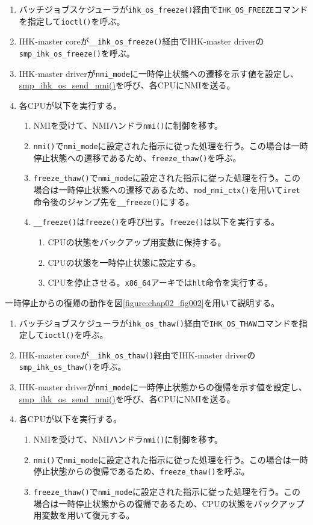 \documentclass[twoside,11pt,fleqn]{book}
\newcommand\textttw[1]{\mathchardef\UrlBreakPenalty=100\mathchardef\UrlBigBreakPenalty=100\url{#1}}
\begin{document}
\begin{enumerate}
\item バッチジョブスケジューラが\texttt{ihk\_os\_freeze()}経由で\texttt{IHK\_OS\_FREEZE}コマンドを指定して\texttt{ioctl()}を呼ぶ。
\item IHK-master coreが\texttt{\_\_ihk\_os\_freeze()}経由でIHK-master driverの\texttt{smp\_ihk\_os\_freeze()}を呼ぶ。
\item IHK-master driverが\texttt{nmi\_mode}に一時停止状態への遷移を示す値を設定し、\textttw{smp\_ihk\_os\_send\_nmi()}を呼び、各CPUにNMIを送る。
\item 各CPUが以下を実行する。
\begin{enumerate}
\item NMIを受けて、NMIハンドラ\texttt{nmi()}に制御を移す。
\item \texttt{nmi()}で\texttt{nmi\_mode}に設定された指示に従った処理を行う。この場合は一時停止状態への遷移であるため、\texttt{freeze\_thaw()}を呼ぶ。
\item \texttt{freeze\_thaw()}で\texttt{nmi\_mode}に設定された指示に従った処理を行う。この場合は一時停止状態への遷移であるため、\texttt{mod\_nmi\_ctx()}を用いて\texttt{iret}命令後のジャンプ先を\texttt{\_\_freeze()}にする。
\item \texttt{\_\_freeze()}は\texttt{freeze()}を呼び出す。\texttt{freeze()}は以下を実行する。
\begin{enumerate}
\item CPUの状態をバックアップ用変数に保持する。
\item CPUの状態を一時停止状態に設定する。
\item CPUを停止させる。\texttt{x86\_64}アーキでは\texttt{hlt}命令を実行する。
\end{enumerate}
\end{enumerate}
\end{enumerate}

一時停止からの復帰の動作を図\ref{figure:chap02_fig002}を用いて説明する。
\begin{enumerate}
\item バッチジョブスケジューラが\texttt{ihk\_os\_thaw()}経由で\texttt{IHK\_OS\_THAW}コマンドを指定して\texttt{ioctl()}を呼ぶ。
\item IHK-master coreが\texttt{\_\_ihk\_os\_thaw()}経由でIHK-master driverの\texttt{smp\_ihk\_os\_thaw()}を呼ぶ。
\item IHK-master driverが\texttt{nmi\_mode}に一時停止状態からの復帰を示す値を設定し、\textttw{smp\_ihk\_os\_send\_nmi()}を呼び、各CPUにNMIを送る。
\item 各CPUが以下を実行する。
\begin{enumerate}
\item NMIを受けて、NMIハンドラ\texttt{nmi()}に制御を移す。
\item \texttt{nmi()}で\texttt{nmi\_mode}に設定された指示に従った処理を行う。この場合は一時停止状態からの復帰であるため、\texttt{freeze\_thaw()}を呼ぶ。
\item \texttt{freeze\_thaw()}で\texttt{nmi\_mode}に設定された指示に従った処理を行う。この場合は一時停止状態からの復帰であるため、CPUの状態をバックアップ用変数を用いて復元する。
\end{enumerate}
\end{enumerate}
\end{document}
